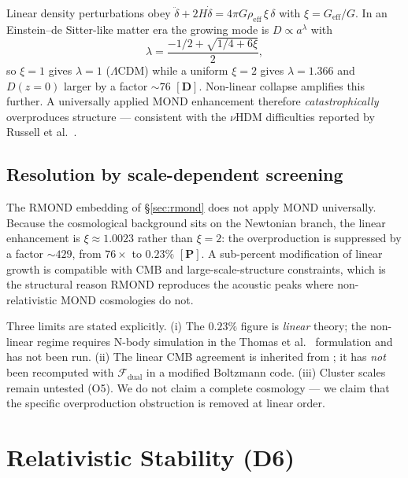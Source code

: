 \documentclass[aps,prd,preprint,superscriptaddress,nofootinbib,amsmath,amssymb,floatfix]{revtex4-2}
\begin{document}
Linear density perturbations obey $\ddot\delta + 2H\dot\delta = 4\pi G\rho_{\text{eff}}\,\xi\,\delta$ with $\xi = G_{\text{eff}}/G$. In an Einstein--de Sitter-like matter era the growing mode is $D\propto a^\lambda$ with
\begin{equation}
\lambda = \frac{-1/2 + \sqrt{1/4 + 6\xi}}{2},
\end{equation}
so $\xi=1$ gives $\lambda=1$ ($\Lambda$CDM) while a uniform $\xi=2$ gives $\lambda=1.366$ and $D(z=0)$ larger by a factor $\sim76$ $\mathbf{[D]}$. Non-linear collapse amplifies this further. A universally applied MOND enhancement therefore \emph{catastrophically} overproduces structure --- consistent with the $\nu$HDM difficulties reported by Russell et al.~\cite{Russell2026}.

\subsection{Resolution by scale-dependent screening}

The RMOND embedding of \S\ref{sec:rmond} does not apply MOND universally. Because the cosmological background sits on the Newtonian branch, the linear enhancement is $\xi \approx 1.0023$ rather than $\xi = 2$: the overproduction is suppressed by a factor $\sim429$, from $76\times$ to $0.23\%$ $\mathbf{[P]}$. A sub-percent modification of linear growth is compatible with CMB and large-scale-structure constraints, which is the structural reason RMOND reproduces the acoustic peaks where non-relativistic MOND cosmologies do not.

\begin{tcolorbox}[colback=boxbg,colframe=primary,title=\textbf{Limits of this result $\mathbf{[O]}$}]
Three limits are stated explicitly. (i) The $0.23\%$ figure is \emph{linear} theory; the non-linear regime requires N-body simulation in the Thomas et al.~\cite{Thomas2023} formulation and has not been run. (ii) The linear CMB agreement is inherited from \cite{SkordisZlosnik2021}; it has \emph{not} been recomputed with $\mathcal{F}_{\text{dual}}$ in a modified Boltzmann code. (iii) Cluster scales remain untested (O5). We do not claim a complete cosmology --- we claim that the specific overproduction obstruction is removed at linear order.
\end{tcolorbox}

\section{Relativistic Stability (D6)}
\label{sec:stability}
\end{document}
